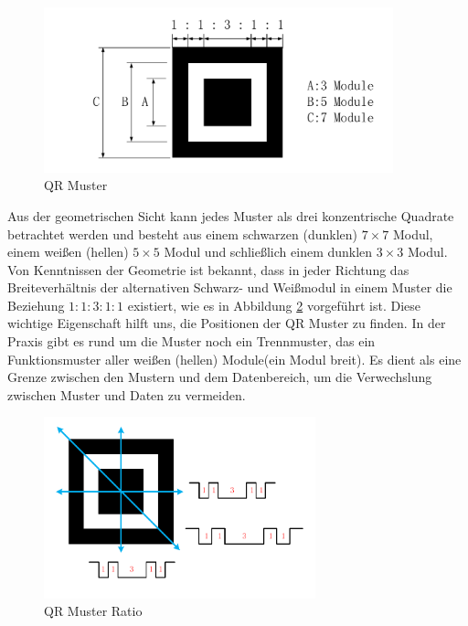 \begin{figure}[H]
 \centering 
 \includegraphics[keepaspectratio,width=0.9\textwidth]{images/3_Ersteverfahren/QRMuster/QRPattern.pdf}
 \caption{QR Muster}
 \label{fig:QRPattern}
\end{figure}

Aus der geometrischen Sicht kann jedes Muster als drei konzentrische Quadrate betrachtet werden und besteht aus einem schwarzen (dunklen) $7 \times 7$ Modul, einem weißen (hellen) $5 \times 5$ Modul und schließlich einem dunklen $3 \times 3$ Modul. Von Kenntnissen der Geometrie ist bekannt, dass in jeder Richtung das Breiteverhältnis der alternativen Schwarz- und Weißmodul in einem Muster die Beziehung $1:1:3:1:1$ existiert, wie es in Abbildung \ref{fig:QRPatternRatio} vorgeführt ist. Diese wichtige Eigenschaft hilft uns, die Positionen der QR Muster zu finden. In der Praxis gibt es rund um die Muster noch ein Trennmuster, das ein Funktionsmuster aller weißen (hellen) Module(ein Modul breit). Es dient als eine Grenze zwischen den Mustern und dem Datenbereich, um die Verwechslung zwischen Muster und Daten zu vermeiden.
 
 \begin{figure}[H]
 \centering 
 \includegraphics[keepaspectratio,width=0.7\textwidth]{images/3_Ersteverfahren/QRMuster/QP_Patternratio.pdf}
 \caption{QR Muster Ratio}
 \label{fig:QRPatternRatio}
\end{figure}

